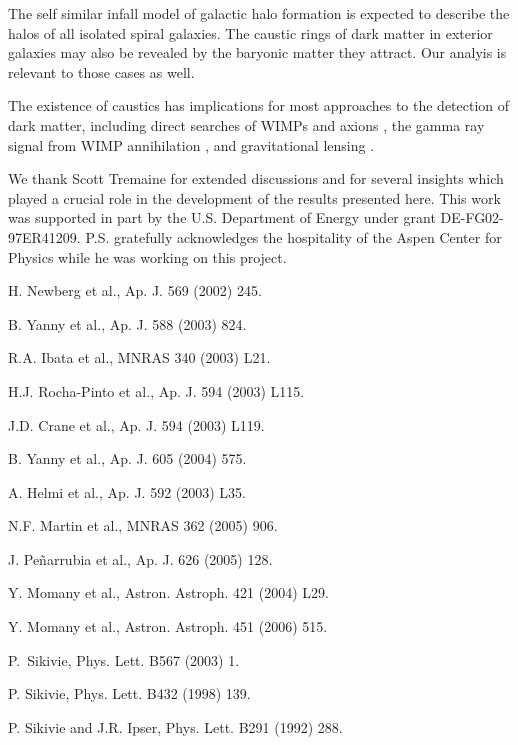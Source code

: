\documentclass[aps,prd,preprint,tightenlines,floatfix,showpacs,groupedaddress]{revtex4}
\begin{document}
{The self similar infall model of galactic halo formation is expected 
to describe the halos of all isolated spiral galaxies.  The caustic 
rings of dark matter in exterior galaxies may also be revealed by the
baryonic matter they attract.  Our analyis is relevant to those cases 
as well.

The existence of caustics has implications for most approaches 
to the detection of dark matter, including direct searches of 
WIMPs \cite{WIMP} and axions \cite{axion}, the gamma ray signal 
from WIMP annihilation \cite{gamma}, and gravitational lensing
\cite{lens}.

\acknowledgments

We thank Scott Tremaine for extended discussions and for 
several insights which played a crucial role in the development 
of the results presented here.  This work was supported in part 
by the U.S. Department of Energy under grant DE-FG02-97ER41209.  
P.S. gratefully acknowledges the hospitality of the Aspen Center 
for Physics while he was working on this project.

\begin{references}

H. Newberg et al., Ap. J. 569 (2002) 245.

B. Yanny et al., Ap. J. 588 (2003) 824.

R.A. Ibata et al., MNRAS 340 (2003) L21.

H.J. Rocha-Pinto et al., Ap. J. 594 (2003) L115.

J.D. Crane et al., Ap. J. 594 (2003) L119. 

B. Yanny et al., Ap. J. 605 (2004) 575.

A. Helmi et al., Ap. J. 592 (2003) L35.

N.F. Martin et al., MNRAS 362 (2005) 906.

J. Pe\~{n}arrubia et al., Ap. J. 626 (2005) 128. 

Y. Momany et al., Astron. Astroph. 421 (2004) L29.

Y. Momany et al., Astron. Astroph. 451 (2006) 515.

P.\ Sikivie, Phys. Lett. B567 (2003) 1.

P. Sikivie, Phys. Lett. B432 (1998) 139.

P. Sikivie and J.R. Ipser, Phys. Lett. B291 (1992) 288.


\end{references}}
\end{document}
